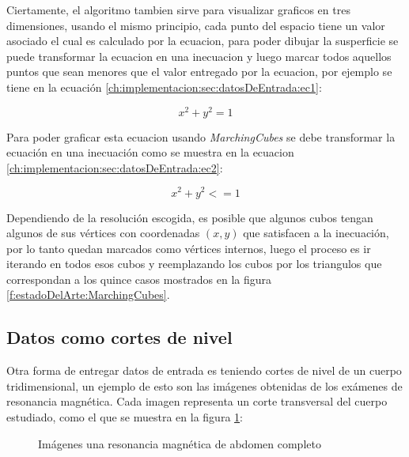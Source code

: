 Ciertamente, el algoritmo tambien sirve para visualizar graficos en tres dimensiones, usando el mismo principio, cada punto del espacio tiene un valor asociado el cual es calculado por la ecuacion, para poder dibujar la susperficie se puede transformar la ecuacion en una inecuacion y luego marcar todos aquellos puntos que sean menores que el valor entregado por la ecuacion, por ejemplo se tiene en la ecuación \ref{ch:implementacion:sec:datosDeEntrada:ec1}:

\begin{equation}
\label{ch:implementacion:sec:datosDeEntrada:ec1}
	x^{2} + y^{2} = 1
\end{equation}

Para poder graficar esta ecuacion usando \emph{MarchingCubes} se debe transformar la ecuación en una inecuación como se muestra en la ecuacion \ref{ch:implementacion:sec:datosDeEntrada:ec2}:

\begin{equation}
\label{ch:implementacion:sec:datosDeEntrada:ec2}
	x^{2} + y^{2} <= 1
\end{equation}

Dependiendo de la resolución escogida, es posible que algunos cubos tengan algunos de sus vértices con coordenadas $(x,y)$ que satisfacen a la inecuación, por lo tanto quedan marcados como vértices internos, luego el proceso es ir iterando en todos esos cubos y reemplazando los cubos por los triangulos que correspondan a los quince casos mostrados en la figura \ref{f:estadoDelArte:MarchingCubes}.

\subsection{Datos como cortes de nivel}
\label{ch:implementacion:sec:datosDeEntrada:subsec:datoscomocurvasdenivel}

Otra forma de entregar datos de entrada es teniendo cortes de nivel de un cuerpo tridimensional, un ejemplo de esto son las imágenes obtenidas de los exámenes de resonancia magnética. Cada imagen representa un corte transversal del cuerpo estudiado, como el que se muestra en la figura \ref{f:ch:implementacion:sec:datosdeentrada:img:ejemplodernm}:

\begin{figure}[hbt]
	\makebox[\textwidth]{\framebox[0.5\textwidth]{\rule{0pt}{0.5\textwidth}}}
	\caption{Imágenes una resonancia magnética de abdomen completo}
	\label{f:ch:implementacion:sec:datosdeentrada:img:ejemplodernm}
\end{figure}

